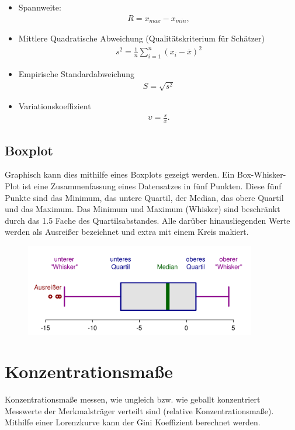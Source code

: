\documentclass[a4paper,10pt]{scrartcl}
\begin{document}
\begin{itemize}
    \item Spannweite:\begin{eqnarray*}R={x}_{max}-{x}_{min},\end{eqnarray*}
    \item Mittlere Quadratische Abweichung (Qualitätskriterium für Schätzer)
    \begin{eqnarray*}{s}^{2}=\frac{1}{n}\displaystyle \sum_{i=1}^{n}{({x}_{i}-\overline{x})}^{2}\end{eqnarray*}
    \item Empirische Standardabweichung 
    \begin{eqnarray*}
    S = \sqrt{{s}^{2}}
    \end{eqnarray*}
    \item Variationskoeffizient 
    \begin{eqnarray*}\upsilon =\frac{s}{x}.\end{eqnarray*}
\end{itemize}
\newpage
\subsection{Boxplot}
Graphisch kann dies mithilfe eines Boxplots gezeigt werden. Ein Box-Whisker-Plot ist eine Zusammenfassung eines Datensatzes in fünf Punkten. Diese fünf Punkte sind das Minimum, das untere Quartil, der Median, das obere Quartil und das Maximum.\newline
Das Minimum und Maximum (Whisker) sind beschränkt durch das 1.5 Fache des Quartilsabstandes. Alle darüber hinausliegenden Werte werden als Ausreißer bezeichnet und extra mit einem Kreis makiert.
\begin{figure}[h] 
  \centering
      \includegraphics[width=0.9\textwidth]{Boxplot.png}
  \label{fig:Bild1}
\end{figure}
\section{Konzentrationsmaße}
Konzentrationsmaße messen, wie ungleich bzw. wie geballt konzentriert Messwerte der Merkmalsträger verteilt sind (relative Konzentrationsmaße). Mithilfe einer Lorenzkurve kann der Gini Koeffizient berechnet werden.
\end{document}
